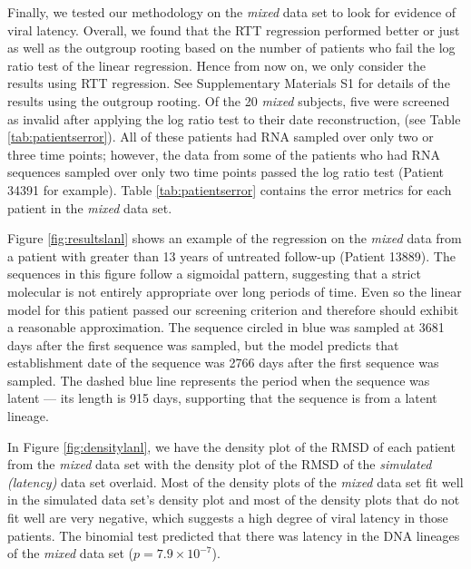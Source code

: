 \documentclass{bmcart}
\begin{document}


Finally, we tested our methodology on the {\em mixed} data set to look for evidence of viral latency.
Overall, we found that the RTT regression performed better or just as well as the outgroup rooting based on the number of patients who fail the log ratio test of the linear regression.
Hence from now on, we only consider the results using RTT regression.
See Supplementary Materials S1 for details of the results using the outgroup rooting.
Of the 20 \emph{mixed} subjects, five were screened as invalid after applying the log ratio test to their date reconstruction, (see Table \ref{tab:patientserror}).
All of these patients had RNA sampled over only two or three time points; however, the data from some of the patients who had RNA sequences sampled over only two time points passed the log ratio test (Patient 34391 for example).
Table \ref{tab:patientserror} contains the error metrics for each patient in the \emph{mixed} data set.

Figure \ref{fig:resultslanl} shows an example of the regression on the \emph{mixed} data from a patient with greater than 13 years of untreated follow-up (Patient 13889).
The sequences in this figure follow a sigmoidal pattern, suggesting that a strict molecular is not entirely appropriate over long periods of time.
Even so the linear model for this patient passed our screening criterion and therefore should exhibit a reasonable approximation.
The sequence circled in blue was sampled at 3681 days after the first sequence was sampled, but the model predicts that  establishment date of the sequence was 2766 days after the first sequence was sampled.
The dashed blue line represents the period when the sequence was latent --- its length is 915 days, supporting that the sequence is from a latent lineage.

In Figure \ref{fig:densitylanl}, we have the density plot of the RMSD of each patient from the \emph{mixed} data set with the density plot of the RMSD of the \emph{simulated (latency)} data set overlaid.
Most of the density plots of the \emph{mixed} data set fit well in the simulated data set's density plot and most of the density plots that do not fit well are very negative, which suggests a high degree of viral latency in those patients.
The binomial test predicted that there was latency in the DNA lineages of the \emph{mixed} data set ($p=7.9 \times 10^{-7}$).
\end{document}
